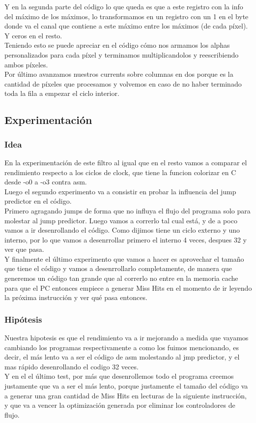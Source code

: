 	
	
   Y en la segunda parte del código lo que queda es que a este registro con la info del máximo de los máximos, lo transformamos en un registro con un 1 en el byte donde va el canal que contiene a este máximo entre los máximos (de cada píxel). Y ceros en el resto. \\ Teniendo esto se puede apreciar en el código cómo nos armamos los alphas personalizados para cada píxel y terminamos multiplicandolos y reescribiendo ambos píxeles. \\
   Por último avanzamos nuestros currents sobre columnas en dos porque es la cantidad de píxeles que procesamos y  volvemos en caso de no haber terminado toda la fila a empezar el ciclo interior.
	
	
\subsection{Experimentación}
\subsubsection{Idea}	En la experimentación de este filtro al igual que en el resto vamos a comparar el rendimiento respecto a los ciclos de clock, que tiene la funcion colorizar en C desde -o0 a -o3 contra asm. \\ Luego el segundo experimento va a consistir en probar la influencia del jump predictor en el código.\\ Primero agragando jumps de forma que no influya el flujo del programa solo para molestar al jump predictor.  Luego vamos a correrlo tal cual está, y de a poco vamos a ir desenrollando el código. Como dijimos tiene un ciclo externo y uno interno, por lo que vamos a desenrrollar primero el interno 4 veces, despues 32 y ver que pasa.\\
Y finalmente el último experimento que vamos a hacer es aprovechar el tamaño que tiene el código y vamos a desenrrollarlo completamente, de manera que generemos un código tan grande que al correrlo no entre en la memoria cache para que el PC entonces empiece a generar Miss Hits en el momento de ir leyendo la próxima instrucción y ver qué pasa entonces.
	   
\subsubsection{Hipótesis}
	Nuestra hipotesis es que el rendimiento va a ir mejorando a medida que vayamos cambiando los programas respectivamente a como los fuimos mencionando, es decir, el más lento va a ser el código de asm molestando al jmp predictor, y el mas rápido desenrollando el codigo 32 veces. \\
	Y en el el último test, por más que desenrollemos todo el programa creemos justamente que va a ser el más lento, porque justamente el tamaño del código va a generar una gran cantidad de Miss Hits en lecturas de la siguiente instrucción, y que va a vencer la optimización generada por eliminar los controladores de flujo.	
	
